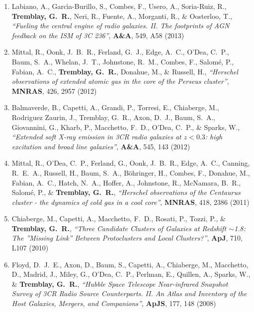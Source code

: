 \documentclass[11pt]{article}
\begin{document}
\begin{enumerate}[resume]
\item Labiano, A., Garc{\'{\i}}a-Burillo, S., Combes, F., Usero, A.,
Soria-Ruiz, R., \textbf{Tremblay, G.~R.}, Neri, R., Fuente, A., Morganti, R.,
\& Oosterloo, T.,  \textit{``Fueling the central engine of radio galaxies. II. The footprints of AGN feedback on the ISM of 3C 236''}, \textbf{A\&A}, 549,  A58 (2013)


\item Mittal, R., Oonk, J.~B.~R., Ferland, G.~J., Edge, A.~C., O'Dea, C.~P.,
Baum, S.~A., Whelan, J.~T., Johnstone, R.~M., Combes, F., Salom{\'e}, P.,
Fabian, A.~C., \textbf{Tremblay, G.~R.}, Donahue, M.,
\& Russell, H., \textit{``Herschel observations of extended atomic gas in the core of the Perseus cluster''}, \textbf{MNRAS}, 426,  2957 (2012)




\item Balmaverde, B., Capetti, A., Grandi, P., Torresi, E., Chiaberge, M.,
Rodriguez Zaurin, J., Tremblay, G.~R., Axon, D.~J., Baum, S.~A.,
Giovannini, G., Kharb, P., Macchetto, F.~D., O'Dea, C.~P.,
\& Sparks, W., \textit{``Extended soft X-ray emission in 3CR radio galaxies at $z< 0.3$: high excitation and broad line galaxies''}, \textbf{A\&A}, 545,  143 (2012)




\item Mittal, R., O'Dea, C.~P., Ferland, G., Oonk, J.~B.~R., Edge, A.~C.,
Canning, R.~E.~A., Russell, H., Baum, S.~A., B{\"o}hringer, H., Combes, F.,
Donahue, M., Fabian, A.~C., Hatch, N.~A., Hoffer, A., Johnstone, R.,
McNamara, B.~R., Salom{\'e}, P.,
\& \textbf{Tremblay, G.~R.}, \textit{``Herschel observations of the Centaurus cluster - the dynamics of cold gas in a cool core''}, \textbf{MNRAS}, 418,  2386 (2011)




\item Chiaberge, M., Capetti, A., Macchetto, F.~D., Rosati, P., Tozzi, P.,
\& \textbf{Tremblay, G.~R.}, \textit{``Three Candidate Clusters of Galaxies at Redshift $\sim$1.8: The ''Missing Link'' Between Protoclusters and Local Clusters?''}, \textbf{ApJ}, 710,  L107 (2010)



\item Floyd, D.~J.~E., Axon, D., Baum, S., Capetti, A., Chiaberge, M.,
Macchetto, D., Madrid, J., Miley, G., O'Dea, C.~P., Perlman, E., Quillen,
A., Sparks, W.,
\& \textbf{Tremblay, G.~R.},  \textit{``Hubble Space Telescope Near-infrared Snapshot Survey of 3CR Radio Source Counterparts. II. An Atlas and Inventory of the Host Galaxies, Mergers, and Companions''}, \textbf{ApJS}, 177,  148 (2008)

\end{enumerate}
\end{document}
